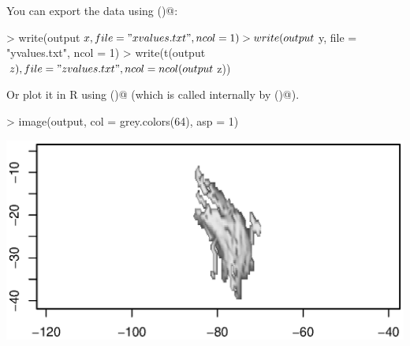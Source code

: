 \documentclass{article}
\renewenvironment{Schunk}{\vspace{\topsep}}{\vspace{\topsep}}
\begin{document}
You can export the data using \verb@write()@:
\begin{Schunk}
\begin{Sinput}
> write(output$x, file = "xvalues.txt", ncol = 1)
> write(output$y, file = "yvalues.txt", ncol = 1)
> write(t(output$z), file = "zvalues.txt", ncol = ncol(output$z))
\end{Sinput}
\end{Schunk}

Or plot it in R using \verb@image()@ (which is called internally by
\verb@showmap()@). 
\begin{Schunk}
\begin{Sinput}
> image(output, col = grey.colors(64), asp = 1)
\end{Sinput}
\end{Schunk}
\includegraphics{figures/fig-027}
\end{document}
